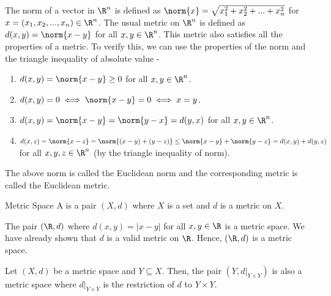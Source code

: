 \documentclass[openany]{book}
\begin{document}
\begin{mynote}
    The norm of a vector in $\R^n$ is defined as $\norm{x} = \sqrt{x_1^2 + x_2^2 + ... + x_n^2}$ for $x = (x_1, x_2, ..., x_n) \in \R^n$. The usual metric on $\R^n$ is defined as $d(x, y) = \norm{x - y}$ for all $x, y \in \R^n$. This metric also satisfies all the properties of a metric. To verify this, we can use the properties of the norm and the triangle inequality of absolute value - 
    \begin{enumerate}
        \item $d(x, y) = \norm{x - y} \geq 0$ for all $x, y \in \R^n$.
        \item $d(x, y) = 0 \iff \norm{x - y} = 0 \iff x = y$.
        \item $d(x, y) = \norm{x - y} = \norm{y - x} = d(y, x)$ for all $x, y \in \R^n$.
        \item $d(x, z) = \norm{x - z} = \norm{(x - y) + (y - z)} \leq \norm{x - y} + \norm{y - z} = d(x, y) + d(y, z)$ for all $x, y, z \in \R^n$ (by the triangle inequality of norm).
    \end{enumerate}
    The above norm is called the Euclidean norm and the corresponding metric is called the Euclidean metric.
\end{mynote}
\begin{mydefinition}{Metric Space}
    A  is a pair $(X, d)$ where $X$ is a set and $d$ is a metric on $X$.
\end{mydefinition}
\begin{example}
    The pair $(\R, d)$ where $d(x, y) = |x - y|$ for all $x, y \in \R$ is a metric space. We have already shown that $d$ is a valid metric on $\R$. Hence, $(\R, d)$ is a metric space.
\end{example}
\begin{mytheorem}
    Let $(X, d)$ be a metric space and $Y \subseteq X$. Then, the pair $(Y, d|_{Y \times Y})$ is also a metric space where $d|_{Y \times Y}$ is the restriction of $d$ to $Y \times Y$.
\end{mytheorem}
\end{document}

